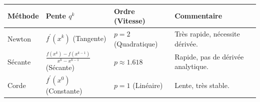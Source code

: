 \begin{table}[H]
\centering
\begin{tabular}{llll}
\toprule
\textbf{Méthode} & \textbf{Pente $q^{k}$} & \textbf{Ordre (Vitesse)} & \textbf{Commentaire} \\ \midrule
Newton & $f^{\prime}(x^{k})$ (Tangente) & $p=2$ (Quadratique) & Très rapide, nécessite dérivée.  \\
Sécante & $\frac{f(x^{k})-f(x^{k-1})}{x^{k}-x^{k-1}}$ (Sécante) & $p\approx1.618$ & Rapide, pas de dérivée analytique.  \\
Corde & $f^{\prime}(x^{0})$ (Constante) & $p=1$ (Linéaire) & Lente, très stable.  \\ \bottomrule
\end{tabular}
\end{table}